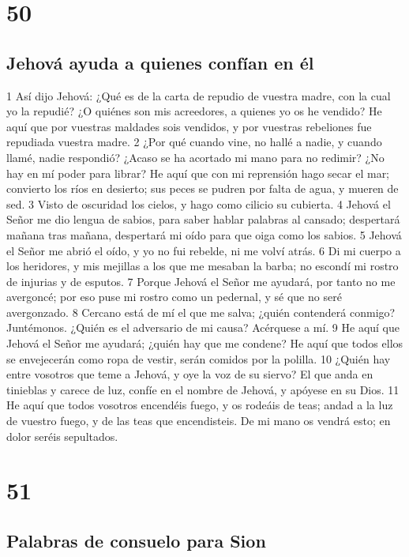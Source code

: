 \chapter{50}

\section*{Jehová ayuda a quienes confían en él}

1 Así dijo Jehová: ¿Qué es de la carta de repudio de vuestra madre, con la cual yo la repudié? ¿O quiénes son mis acreedores, a quienes yo os he vendido? He aquí que por vuestras maldades sois vendidos, y por vuestras rebeliones fue repudiada vuestra madre.
2 ¿Por qué cuando vine, no hallé a nadie, y cuando llamé, nadie respondió? ¿Acaso se ha acortado mi mano para no redimir? ¿No hay en mí poder para librar? He aquí que con mi reprensión hago secar el mar; convierto los ríos en desierto; sus peces se pudren por falta de agua, y mueren de sed. 
3 Visto de oscuridad los cielos, y hago como cilicio su cubierta.
4 Jehová el Señor me dio lengua de sabios, para saber hablar palabras al cansado; despertará mañana tras mañana, despertará mi oído para que oiga como los sabios.
5 Jehová el Señor me abrió el oído, y yo no fui rebelde, ni me volví atrás.
6 Di mi cuerpo a los heridores, y mis mejillas a los que me mesaban la barba; no escondí mi rostro de injurias y de esputos. 
7 Porque Jehová el Señor me ayudará, por tanto no me avergoncé; por eso puse mi rostro como un pedernal, y sé que no seré avergonzado.
8 Cercano está de mí el que me salva; ¿quién contenderá conmigo? Juntémonos. ¿Quién es el adversario de mi causa? Acérquese a mí.
9 He aquí que Jehová el Señor me ayudará; ¿quién hay que me condene? He aquí que todos ellos se envejecerán como ropa de vestir, serán comidos por la polilla.
10 ¿Quién hay entre vosotros que teme a Jehová, y oye la voz de su siervo? El que anda en tinieblas y carece de luz, confíe en el nombre de Jehová, y apóyese en su Dios.
11 He aquí que todos vosotros encendéis fuego, y os rodeáis de teas; andad a la luz de vuestro fuego, y de las teas que encendisteis. De mi mano os vendrá esto; en dolor seréis sepultados.

\chapter{51}

\section*{Palabras de consuelo para Sion}

